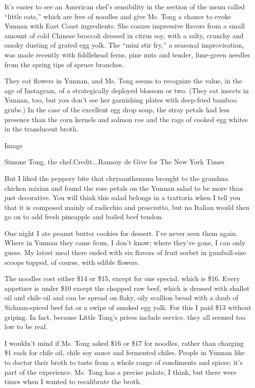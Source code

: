 It's easier to see an American chef's sensibility in the section of the
menu called ``little eats,'' which are free of noodles and give Ms. Tong
a chance to evoke Yunnan with East Coast ingredients. She coaxes
impressive flavors from a small amount of cold Chinese broccoli dressed
in citrus soy, with a salty, crunchy and smoky dusting of grated egg
yolk. The ``mini stir fry,'' a seasonal improvisation, was made recently
with fiddlehead ferns, pine nuts and tender, lime-green needles from the
spring tips of spruce branches.

They eat flowers in Yunnan, and Ms. Tong seems to recognize the value,
in the age of Instagram, of a strategically deployed blossom or two.
(They eat insects in Yunnan, too, but you don't see her garnishing
plates with deep-fried bamboo grubs.) In the case of the excellent egg
drop soup, the stray petals had less presence than the corn kernels and
salmon roe and the rags of cooked egg whites in the translucent broth.

Image

Simone Tong, the chef.Credit...Ramsay de Give for The New York Times

But I liked the peppery bite that chrysanthemum brought to the grandma
chicken mixian and found the rose petals on the Yunnan salad to be more
than just decorative. You will think this salad belongs in a trattoria
when I tell you that it is composed mainly of radicchio and prosciutto,
but no Italian would then go on to add fresh pineapple and boiled beef
tendon.

One night I ate peanut butter cookies for dessert. I've never seen them
again. Where in Yunnan they came from, I don't know; where they've gone,
I can only guess. My latest meal there ended with six flavors of fruit
sorbet in gumball-size scoops topped, of course, with edible flowers.

The noodles cost either \$14 or \$15, except for one special, which is
\$16. Every appetizer is under \$10 except the chopped raw beef, which
is dressed with shallot oil and chile oil and can be spread on flaky,
oily scallion bread with a daub of Sichuan-spiced beef fat or a swipe of
smoked egg yolk. For this I paid \$13 without griping. In fact, because
Little Tong's prices include service, they all seemed too low to be
real.

I wouldn't mind if Ms. Tong asked \$16 or \$17 for noodles, rather than
charging \$1 each for chile oil, chile soy sauce and fermented chiles.
People in Yunnan like to doctor their broth to taste from a whole range
of condiments and spices; it's part of the experience. Ms. Tong has a
precise palate, I think, but there were times when I wanted to
recalibrate the broth.

